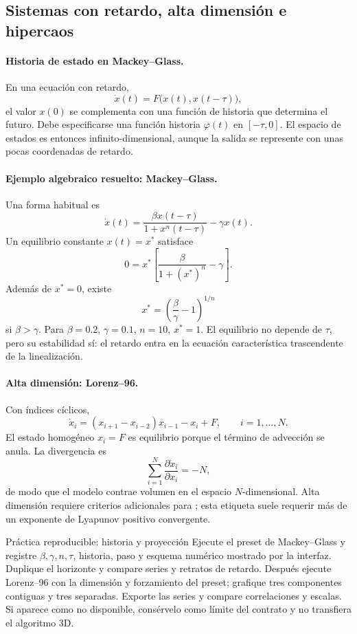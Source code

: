 \subsection{Sistemas con retardo, alta dimensión e hipercaos}

\paragraph{Historia de estado en Mackey--Glass.}
En una ecuación con retardo,
\[
 \dot x(t)=F\bigl(x(t),x(t-\tau)\bigr),
\]
el valor \(x(0)\) se complementa con una función de historia que determina el futuro. Debe especificarse una función
historia \(\varphi(t)\) en \([-\tau,0]\). El espacio de estados es entonces
infinito-dimensional, aunque la salida se represente con unas pocas coordenadas de
retardo.

\paragraph{Ejemplo algebraico resuelto: Mackey--Glass.}
Una forma habitual es
\[
 \dot x(t)=
 \frac{\beta x(t-\tau)}{1+x^n(t-\tau)}-\gamma x(t).
\]
Un equilibrio constante \(x(t)=x^*\) satisface
\[
 0=x^*\left[\frac{\beta}{1+(x^*)^n}-\gamma\right].
\]
Además de \(x^*=0\), existe
\[
 x^*=\left(\frac{\beta}{\gamma}-1\right)^{1/n}
\]
si \(\beta>\gamma\). Para \(\beta=0.2\), \(\gamma=0.1\), \(n=10\),
\(x^*=1\). El equilibrio no depende de \(\tau\), pero su estabilidad sí: el retardo
entra en la ecuación característica trascendente de la linealización.

\paragraph{Alta dimensión: Lorenz--96.}
Con índices cíclicos,
\[
 \dot x_i=(x_{i+1}-x_{i-2})x_{i-1}-x_i+F,
 \qquad i=1,\ldots,N.
\]
El estado homogéneo \(x_i=F\) es equilibrio porque el término de advección se anula.
La divergencia es
\[
 \sum_{i=1}^{N}\frac{\partial\dot x_i}{\partial x_i}=-N,
\]
de modo que el modelo contrae volumen en el espacio \(N\)-dimensional. Alta dimensión
requiere criterios adicionales para ; esta etiqueta suele requerir más de un exponente de
Lyapunov positivo convergente.

\begin{activitybox}{Práctica reproducible: historia y proyección}
Ejecute el preset de Mackey--Glass y registre \(\beta,\gamma,n,\tau\), historia,
paso y esquema numérico mostrado por la interfaz. Duplique el horizonte y compare
series y retratos de retardo. Después ejecute Lorenz--96 con la dimensión y forzamiento
del preset; grafique tres componentes contiguas y tres separadas. Exporte las series y
compare correlaciones y escalas. Si  aparece como no disponible,
consérvelo como límite del contrato y no transfiera el algoritmo 3D.
\end{activitybox}

